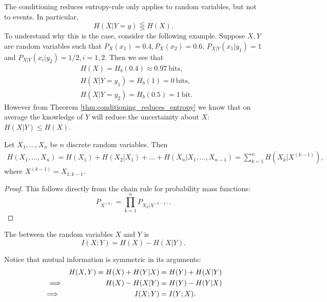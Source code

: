 \documentclass[11pt,a4paper]{article}
\begin{document}
\begin{remark}
    The conditioning reduces entropy-rule only applies to random variables, but not to events. In particular,
    \begin{equation*}
        H(X|Y = y) \lesseqgtr H(X).
    \end{equation*}
    To understand why this is the case, consider the following example. Suppose $X,Y$ are random variables such that $P_X(x_1) = 0.4, P_X(x_2) = 0.6$, $P_{X|Y}(x_1|y_1) = 1$ and $P_{X|Y}(x_i|y_2) = 1/2, i = 1, 2$. Then we see that 
    \begin{align*}
        &H(X) = H_b(0.4) \approx 0.97\ \text{bits}, \\
        &H(X|Y = y_1) = H_b(1) = 0\ \text{bits}, \\
        &H(X|Y = y_2) = H_b(0.5) = 1\ \text{bit}.
    \end{align*}
    However from Theorem \ref{thm:conditioning_reduces_entropy} we know that on average the knowledge of $Y$ will reduce the uncertainity about $X$: $H(X|Y)\le H(X)$.
\end{remark}

\begin{theorem}
    Let $X_1,\ldots,X_n$ be $n$ discrete random variables. Then 
    \begin{align*}
        H(X_1,\ldots,X_n) = H(X_1) + H(X_2|X_1) + \ldots + H(X_n | X_1,\ldots,X_{n-1})= \sum_{k=1}^n H(X_k|X^{(k-1)}),
    \end{align*}
    where $X^{(k-1)} = X_{1:k-1}$.
\end{theorem}

\begin{proof}
    This follows directly from the chain rule for probability mass functions:
    \begin{equation*}
        P_{X^{(n)}} = \prod_{k=1}^n P_{X_k|X^{(k-1)}}.
    \end{equation*}
\end{proof}

\begin{definition}
    The  between the random variables $X$ and $Y$ is
    \begin{equation*}
        I(X;Y) = H(X) - H(X|Y).
    \end{equation*}
\end{definition}

\begin{remark}
    Notice that mutual information is symmetric in its arguments:
    \begin{align*}
        H(X,Y) = H(X) + H(Y|X) &= H(Y) + H(X|Y) \\
        \implies\hspace{2cm} H(X) - H(X|Y) &= H(Y) - H(Y|X) \\
        \implies\hspace{3.55cm} I(X;Y) &= I(Y;X).
    \end{align*}
\end{remark}
\end{document}
